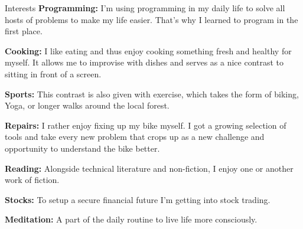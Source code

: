 \documentclass{cv}
\begin{document}
\begin{rSection}{Interests}
  {\bf Programming:} I'm using programming in my daily life to solve all hosts
of problems to make my life easier. That's why I learned to program in the first
place.

  {\bf Cooking:} I like eating and thus enjoy cooking something fresh and
healthy for myself. It allows me to improvise with dishes and serves as a nice
contrast to sitting in front of a screen.

  {\bf Sports:} This contrast is also given with exercise, which takes the form of biking, Yoga, or longer walks around the local forest.

  {\bf Repairs:} I rather enjoy fixing up my bike myself. I got a growing selection of tools and take every new problem that crops up as a new challenge and opportunity to understand the bike better.

  {\bf Reading:} Alongside technical literature and non-fiction, I enjoy one or another work of fiction.

  {\bf Stocks:} To setup a secure financial future I'm getting into stock trading.

  {\bf Meditation:} A part of the daily routine to live life more consciously.

\end{rSection}
\end{document}
